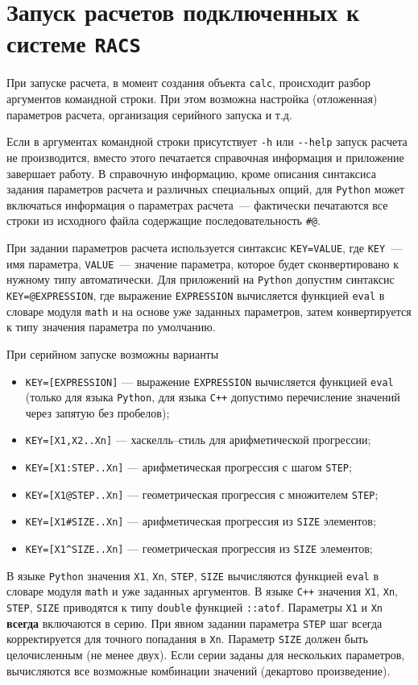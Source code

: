 \section{Запуск расчетов подключенных к системе {\tt RACS}}
При запуске расчета, в момент создания объекта \verb'calc', происходит разбор аргументов командной строки.
При этом возможна настройка (отложенная) параметров расчета, организация серийного запуска и т.д.

Если в аргументах командной строки присутствует \verb'-h' или \verb'--help' запуск расчета не производится, вместо этого печатается
справочная информация и приложение завершает работу. В справочную информацию, кроме  описания синтаксиса задания параметров расчета
и различных специальных опций, для \verb'Python' может включаться информация о параметрах расчета~--- фактически
печатаются все строки из исходного файла содержащие последовательность \verb'#@'.

При задании параметров расчета используется синтаксис \verb'KEY=VALUE', где \verb'KEY'~--- имя параметра, \verb'VALUE'~--- значение параметра,
которое будет сконвертировано к нужному типу автоматически. Для приложений на \verb'Python' допустим синтаксис
\verb'KEY=@EXPRESSION', где выражение \verb'EXPRESSION' вычисляется 
функцией \verb'eval' в словаре модуля \verb'math' и на основе уже заданных параметров, затем 
конвертируется к типу значения параметра по умолчанию.

При серийном запуске возможны варианты
\begin{itemize}
\item\verb'KEY=[EXPRESSION]'  --- выражение \verb'EXPRESSION' вычисляется функцией \verb'eval' (только для языка \verb'Python',
  для языка \verb'C++' допустимо перечисление значений через запятую без пробелов);
\item\verb'KEY=[X1,X2..Xn]'   --- хаскелль--стиль для арифметической прогрессии;
\item\verb'KEY=[X1:STEP..Xn]' --- арифметическая прогрессия с шагом \verb'STEP';
\item\verb'KEY=[X1@STEP..Xn]' --- геометрическая прогрессия с множителем \verb'STEP';
\item\verb'KEY=[X1#SIZE..Xn]' --- арифметическая прогрессия из \verb'SIZE' элементов;
\item\verb'KEY=[X1^SIZE..Xn]' --- геометрическая прогрессия из \verb'SIZE' элементов;
\end{itemize}
В языке \verb'Python' значения \verb'X1', \verb'Xn', \verb'STEP', \verb'SIZE' вычисляются функцией \verb'eval' в словаре модуля \verb'math' и уже 
заданных аргументов. В языке \verb'C++' значения \verb'X1', \verb'Xn', \verb'STEP', \verb'SIZE'
приводятся к типу \verb'double' функцией \verb'::atof'.
Параметры \verb'X1' и \verb'Xn' {\bf всегда} включаются в серию. При явном задании 
параметра \verb'STEP' шаг всегда корректируется для точного попадания в \verb'Xn'. Параметр \verb'SIZE' 
должен быть целочисленным  (не менее двух). Если серии заданы для нескольких 
параметров, вычисляются все возможные комбинации значений (декартово произведение).

